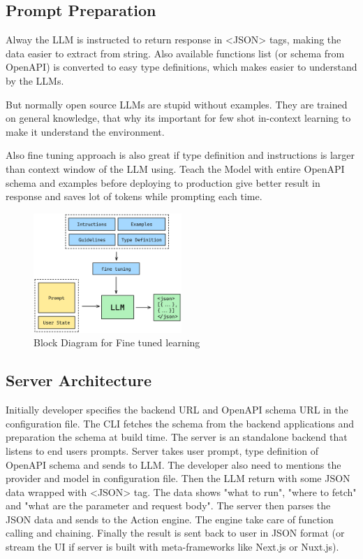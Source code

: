 \documentclass[conference]{IEEEtran}
\begin{document}
\subsection{Prompt Preparation}
Alway the LLM is instructed to return response in <JSON> tags, making the data easier to extract from string. Also available functions list (or schema from OpenAPI) is converted to easy type definitions, which makes easier to understand by the LLMs. 

But normally open source LLMs are stupid without examples. They are trained on general knowledge, that why its important for few shot in-context learning to make it understand the environment.

Also fine tuning approach is also great if type definition and instructions is larger than context window of the LLM using. Teach the Model with entire OpenAPI schema and examples before deploying to production give better result in response and saves lot of tokens while prompting each time. 

\begin{figure}[htbp]
\centering
\includegraphics[width=0.5\textwidth]{images/fine-tuned.png}  
\caption{Block Diagram for Fine tuned learning}
\label{fig}
\end{figure}

\subsection{Server Architecture}
Initially developer specifies the backend URL and OpenAPI schema URL in the configuration file. The CLI fetches the schema from the backend applications and preparation the schema at build time. The server is an standalone backend that listens to end users prompts. Server takes user prompt, type definition of OpenAPI schema and sends to LLM. The developer also need to mentions the provider and model in configuration file. Then the LLM return with some JSON data wrapped with <JSON> tag. The data shows "what to run", "where to fetch" and "what are the parameter and request body". The server then parses the JSON data and sends to the Action engine. The engine take care of function calling and chaining. Finally the result is sent back to user in JSON format (or stream the UI if server is built with meta-frameworks like Next.js or Nuxt.js).
\end{document}
